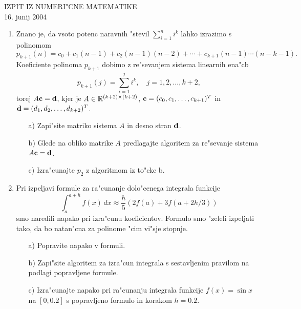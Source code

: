 

\begin{center}
  IZPIT IZ NUMERI"CNE MATEMATIKE\\
  16. junij 2004
\end{center}
\vspace{1cm}

\begin{enumerate}
  \item Znano je, da vsoto potenc naravnih "stevil $\sum_{i=1}^n i^k$
    lahko izrazimo s polinomom 
    $$p_{k+1}(n)=c_0+c_1(n-1)+c_2(n-1)(n-2)+
    \cdots+c_{k+1}(n-1)\cdots(n-k-1).$$
    Koeficiente polinoma $p_{k+1}$ dobimo z re"sevanjem sistema linearnih
   ena"cb
    $$p_{k+1}(j)=\sum_{i=1}^{j}i^k,\quad j=1,2,\dots,k+2,$$
    torej $A\mathbf{c}=\mathbf{d}$,
    kjer je $A\in\mathbb{R}^{(k+2)\times(k+2)}$, 
    $\mathbf{c}=(c_0,c_1,\dots,c_{k+1})^T$ in $\mathbf{d}=(d_1,d_2,\dots,d_{k+2})^T$.
  \begin{itemize}
    \item[a)] Zapi"site matriko sistema $A$ in desno stran $\mathbf{d}$.
    \item[b)] Glede na obliko matrike $A$ predlagajte algoritem za 
      re"sevanje sistema $A\mathbf{c}=\mathbf{d}$.
    \item[c)] Izra"cunajte $p_2$ z algoritmom iz to"cke b.
  \end{itemize}
  \item Pri izpeljavi formule za ra"cunanje dolo"cenega integrala funkcije
    $$\int_{a}^{a+h}f(x)\,dx\approx \frac{h}{5}\left(2f(a)+3f(a+2h/3)\right)$$
    smo naredili napako pri izra"cunu koeficientov. 
    Formulo smo "zeleli izpeljati tako, da bo
    natan"cna za polinome "cim vi"sje stopnje.
    \begin{itemize}
     \item[a)] Popravite napako v formuli.
     \item[b)] Zapi"site algoritem za izra"cun integrala s sestavljenim
       pravilom na podlagi popravljene formule.
     \item[c)] Izra"cunajte napako pri ra"cunanju integrala funkcije
       $f(x)=\sin{x}$ na $[0,0.2]$ s popravljeno formulo in korakom $h=0.2$.
    \end{itemize}
\end{enumerate}
